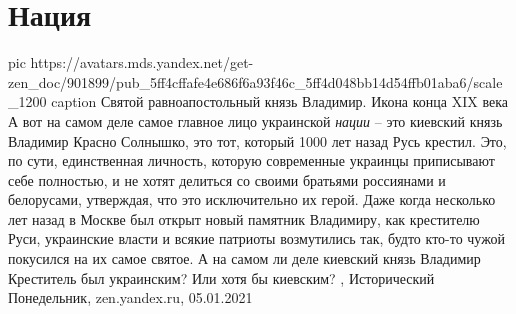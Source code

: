  
 
 
 
 
\chapter{Нация}

\ifcmt
  pic https://avatars.mds.yandex.net/get-zen_doc/901899/pub_5ff4cffafe4e686f6a93f46c_5ff4d048bb14d54ffb01aba6/scale_1200
	caption Святой равноапостольный князь Владимир. Икона конца XIX века
\fi
А вот на самом деле самое главное лицо украинской \emph{нации} – это киевский
князь Владимир Красно Солнышко, это тот, который 1000 лет назад Русь крестил.
Это, по сути, единственная личность, которую современные украинцы приписывают
себе полностью, и не хотят делиться со своими братьями россиянами и белорусами,
утверждая, что это исключительно их герой.  Даже когда несколько лет назад в
Москве был открыт новый памятник Владимиру, как крестителю Руси, украинские
власти и всякие патриоты возмутились так, будто кто-то чужой покусился на их
самое святое. А на самом ли деле киевский князь Владимир Креститель был
украинским? Или хотя бы киевским?
,
Исторический Понедельник, zen.yandex.ru, 05.01.2021 

